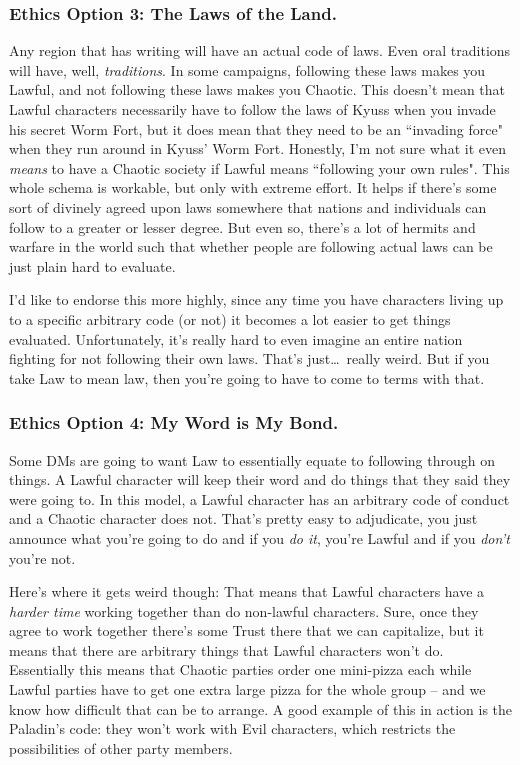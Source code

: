 \subsubsection{Ethics Option 3: The Laws of the Land.}
Any region that has writing will have an actual code of laws. Even oral traditions will have, well, \textit{traditions}. In some campaigns, following these laws makes you Lawful, and not following these laws makes you Chaotic. This doesn't mean that Lawful characters necessarily have to follow the laws of Kyuss when you invade his secret Worm Fort, but it does mean that they need to be an ``invading force" when they run around in Kyuss' Worm Fort. Honestly, I'm not sure what it even \textit{means} to have a Chaotic society if Lawful means ``following your own rules". This whole schema is workable, but only with extreme effort. It helps if there's some sort of divinely agreed upon laws somewhere that nations and individuals can follow to a greater or lesser degree. But even so, there's a lot of hermits and warfare in the world such that whether people are following actual laws can be just plain hard to evaluate.

I'd like to endorse this more highly, since any time you have characters living up to a specific arbitrary code (or not) it becomes a lot easier to get things evaluated. Unfortunately, it's really hard to even imagine an entire nation fighting for not following their own laws. That's just\ldots\  really weird. But if you take Law to mean law, then you're going to have to come to terms with that.

\subsubsection{Ethics Option 4: My Word is My Bond.}
Some DMs are going to want Law to essentially equate to following through on things. A Lawful character will keep their word and do things that they said they were going to. In this model, a Lawful character has an arbitrary code of conduct and a Chaotic character does not. That's pretty easy to adjudicate, you just announce what you're going to do and if you \textit{do it}, you're Lawful and if you \textit{don't} you're not.

Here's where it gets weird though: That means that Lawful characters have a \textit{harder time} working together than do non-lawful characters. Sure, once they agree to work together there's some Trust there that we can capitalize, but it means that there are arbitrary things that Lawful characters won't do. Essentially this means that Chaotic parties order one mini-pizza each while Lawful parties have to get one extra large pizza for the whole group -- and we know how difficult that can be to arrange. A good example of this in action is the Paladin's code: they won't work with Evil characters, which restricts the possibilities of other party members.

